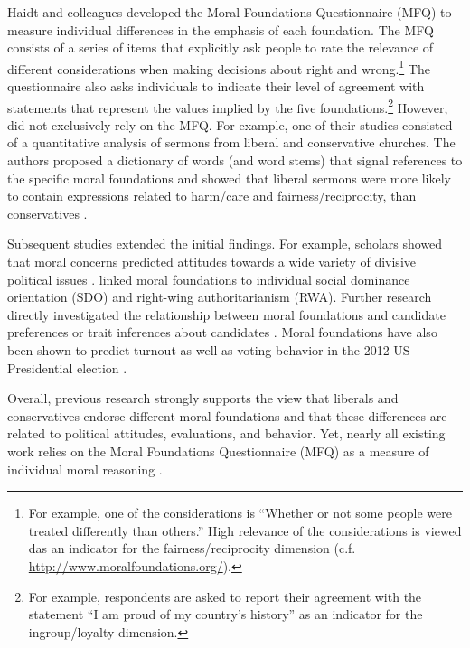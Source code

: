 \documentclass[12pt]{article}
\begin{document}
Haidt and colleagues developed the Moral Foundations Questionnaire (MFQ) to measure individual differences in the emphasis of each foundation. The MFQ consists of a series of items that explicitly ask people to rate the relevance of different considerations when making decisions about right and wrong.\footnote{For example, one of the considerations is ``Whether or not some people were treated differently than others.'' High relevance of the considerations is viewed das an indicator for the fairness/reciprocity dimension (c.f. \url{http://www.moralfoundations.org/}).} The questionnaire also asks individuals to indicate their level of agreement with statements that represent the values implied by the five foundations.\footnote{For example, respondents are asked to report their agreement with the statement ``I am proud of my country’s history'' as an indicator for the ingroup/loyalty dimension.} However, \citet{graham2009liberals} did not exclusively rely on the MFQ. For example, one of their studies consisted of a quantitative analysis of sermons from liberal and conservative churches. The authors proposed a dictionary of words (and word stems) that signal references to the specific moral foundations and showed that liberal sermons were more likely to contain expressions related to harm/care and fairness/reciprocity, than conservatives \citep[see also][for multi-dimensional conceptualizations of ideology]{haidt2009above}.

Subsequent studies extended the initial findings. For example, scholars showed that moral concerns predicted attitudes towards a wide variety of divisive political issues \citep[e.g.][]{koleva2012tracing,low2015moral}. \citet{federico2013mapping} linked moral foundations to individual social dominance orientation (SDO) and right-wing authoritarianism (RWA). Further research directly investigated the relationship between moral foundations and candidate preferences \citep{iyer2010beyond} or trait inferences about candidates \citep{clifford2014linking}. Moral foundations have also been shown to predict turnout \citep{johnson2014ideology} as well as voting behavior in the 2012 US Presidential election \citep{franks2015using}.

Overall, previous research strongly supports the view that liberals and conservatives endorse different moral foundations and that these differences are related to political attitudes, evaluations, and behavior. Yet, nearly all existing work relies on the Moral Foundations Questionnaire (MFQ) as a measure of individual moral reasoning \citep[but see][]{clifford2014linking}. 
\end{document}
